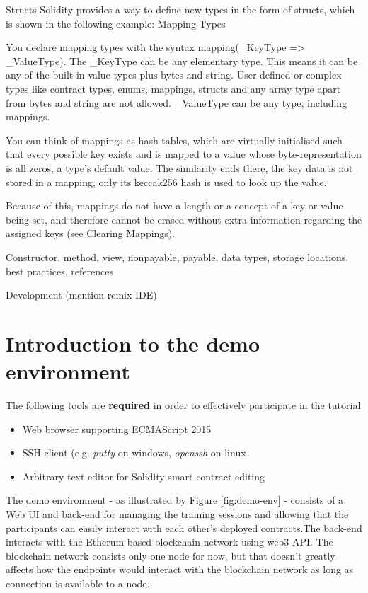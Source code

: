 \documentclass[a4paper]{article}
\begin{document}
Structs
Solidity provides a way to define new types in the form of structs, which is shown in the following example:
Mapping Types

You declare mapping types with the syntax mapping(_KeyType => _ValueType). The _KeyType can be any elementary type. This means it can be any of the built-in value types plus bytes and string. User-defined or complex types like contract types, enums, mappings, structs and any array type apart from bytes and string are not allowed. _ValueType can be any type, including mappings.

You can think of mappings as hash tables, which are virtually initialised such that every possible key exists and is mapped to a value whose byte-representation is all zeros, a type’s default value. The similarity ends there, the key data is not stored in a mapping, only its keccak256 hash is used to look up the value.

Because of this, mappings do not have a length or a concept of a key or value being set, and therefore cannot be erased without extra information regarding the assigned keys (see Clearing Mappings).

Constructor, method, view, nonpayable, payable, data types, storage locations, best practices, references 

Development (mention remix IDE)

\section{Introduction to the demo environment}

The following tools are \textbf{required} in order to effectively participate in the tutorial
\begin{itemize}
    \item Web browser supporting ECMAScript 2015
    \item SSH client (e.g. \emph{putty} on windows, \emph{openssh} on linux
    \item Arbitrary text editor for Solidity smart contract editing
\end{itemize}{}

The \href{https://blockchain.cnsm2019-tutorial.com/}{demo environment} - as illustrated by Figure \ref{fig:demo-env} - consists of a Web UI and back-end for managing the training sessions and allowing that the participants can easily interact with each other's deployed contracts.The back-end interacts with the Etherum based blockchain network using web3 API. The blockchain network consists only one node for now, but that doesn't greatly affects how the endpoints would interact with the blockchain network as long as connection is available to a node.
\end{document}
